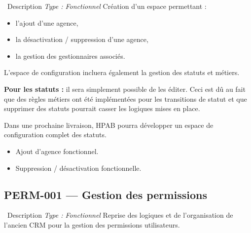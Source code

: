 \documentclass[12pt,a4paper]{article}
\newcommand{\checkmark}{\ding{51}}
\begin{document}
\begin{featurebox}{\faBuilding\ Description \hfill \textit{Type : Fonctionnel}}
Création d'un espace permettant :
\begin{itemize}[leftmargin=2em, itemsep=0pt]
    \item l'ajout d'une agence,
    \item la désactivation / suppression d'une agence,
    \item la gestion des gestionnaires associés.
\end{itemize}

\vspace{0.3cm}
L'espace de configuration incluera également la gestion des statuts et métiers.

\vspace{0.3cm}
\textbf{Pour les statuts :} il sera simplement possible de les éditer. Ceci est dû au fait que des règles métiers ont été implémentées pour les transitions de statut et que supprimer des statuts pourrait casser les logiques mises en place.

\vspace{0.3cm}
\begin{tcolorbox}[colback=gmbs-gray!10,colframe=gmbs-gray,title={\faInfoCircle\ Non inclus}]
Dans une prochaine livraison, HPAB pourra développer un espace de configuration complet des statuts.
\end{tcolorbox}
\end{featurebox}

\begin{testbox}
\begin{itemize}[leftmargin=2em, itemsep=2pt]
    \item[\checkmark] Ajout d'agence fonctionnel.
    \item[\checkmark] Suppression / désactivation fonctionnelle.
\end{itemize}
\end{testbox}

\subsection{PERM-001 — Gestion des permissions}
\label{subsec:perm-001}

\begin{featurebox}{\faLock\ Description \hfill \textit{Type : Fonctionnel}}
Reprise des logiques et de l'organisation de l'ancien CRM pour la gestion des permissions utilisateurs.
\end{featurebox}
\end{document}
